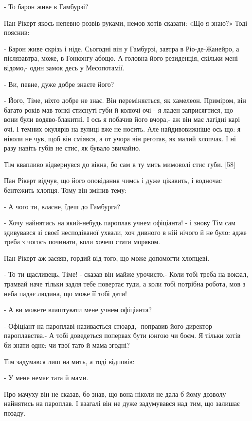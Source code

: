- То барон живе в Гамбурзі?

Пан Рікерт якось непевно розвів руками, немов хотів сказати: «Що я знаю?» Тоді пояснив:

- Барон живе скрізь і ніде. Сьогодні він у Гамбурзі, завтра в Ріо-де-Жанейро, а післязавтра, може, в Гонконгу абощо. А головна його резиденція, скільки мені відомо,- один замок десь у Месопотамії.

- Ви, певне, дуже добре знаєте його?

- Його, Тіме, ніхто добре не знає. Він переміняється, як хамелеон. Приміром, він багато років мав тонкі стиснуті губи й колючі очі - я ладен заприсягтися, що вони були водяво-блакитні. І ось я побачив його вчора,- аж він має лагідні карі очі. І темних окулярів на вулиці вже не носить. Але найдивовижніше ось що: я ніколи не чув, щоб він сміявся, а от учора він реготав, як малий хлопчак. І ні разу навіть губів не стис, як бувало звичайно.

Тім квапливо відвернувся до вікна, бо сам в ту мить мимоволі стис губи. [58]

Пан Рікерт відчув, що його оповідання чимсь і дуже цікавить, і водночас бентежить хлопця. Тому він змінив тему:

- А чого ти, власне, їдеш до Гамбурга?

- Хочу найнятись на який-небудь пароплав учнем офіціанта! - і знову Тім сам здивувався зі своєї несподіваної ухвали, хоч дивного в ній нічого й не було: адже треба з чогось починати, коли хочеш стати моряком.

Пан Рікерт аж засяяв, гордий від того, що може допомогти хлопцеві.

- То ти щасливець, Тіме! - сказав він майже урочисто.- Коли тобі треба на вокзал, трамвай наче тільки задля тебе повертає туди, а коли тобі потрібна робота, мов з неба падає людина, що може її тобі дати!

- А ви можете влаштувати мене учнем офіціанта?

- Офіціант на пароплаві називається стюард,- поправив його директор пароплавства.- А тобі доведеться попервах бути юнгою чи боєм. Я тільки хотів би знати одне: чи твої тато й мама згодні?

Тім задумався лиш на мить, а тоді відповів:

- У мене немає тата й мами.

Про мачуху він не сказав, бо знав, що вона ніколи не дала б йому дозволу найнятись на пароплав. І взагалі він не дуже задумувався над тим, що залишає позаду.

